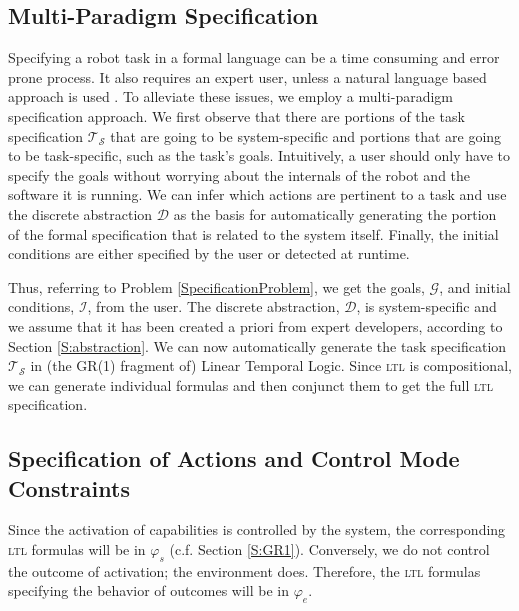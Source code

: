 
\subsection{Multi-Paradigm Specification}

Specifying a robot task in a formal language can be a time consuming and error prone process.
It also requires an expert user, unless a natural language based approach is used \cite{Lignos2015AURO}. 
To alleviate these issues, we employ a multi-paradigm specification approach. 
We first observe that there are portions of the task specification $\mathcal{T}_\mathcal{S}$ that are going to be system-specific and portions that are going to be task-specific, such as the task's goals.
Intuitively, a user should only have to specify the goals without worrying about the internals of the robot and the software it is running.
We can infer which actions are pertinent to a task and use the discrete abstraction $\mathcal{D}$ as the basis for automatically generating the portion of the formal specification that is related to the system itself.
Finally, the initial conditions are either specified by the user or detected at runtime.

Thus, referring to Problem \ref{SpecificationProblem}, we get the goals, $\mathcal{G}$, and initial conditions, $\mathcal{I}$, from the user.
The discrete abstraction, $\mathcal{D}$, is system-specific and we assume that it has been created a priori from expert developers, according to Section \ref{S:abstraction}.
We can now automatically generate the task specification $\mathcal{T}_\mathcal{S}$ in (the GR(1) fragment \cite{Bloem2012GR1} of) Linear Temporal Logic.
Since \textsc{ltl} is compositional, we can generate individual formulas and then conjunct them to get the full \textsc{ltl} specification.


\subsection{Specification of Actions and Control Mode Constraints}

Since the activation of capabilities is controlled by the system, the corresponding \textsc{ltl} formulas will be in $\varphi_s$ (c.f. Section \ref{S:GR1}).
Conversely, we do not control the outcome of activation; the environment does.
Therefore, the \textsc{ltl} formulas specifying the behavior of outcomes will be in $\varphi_e$.

